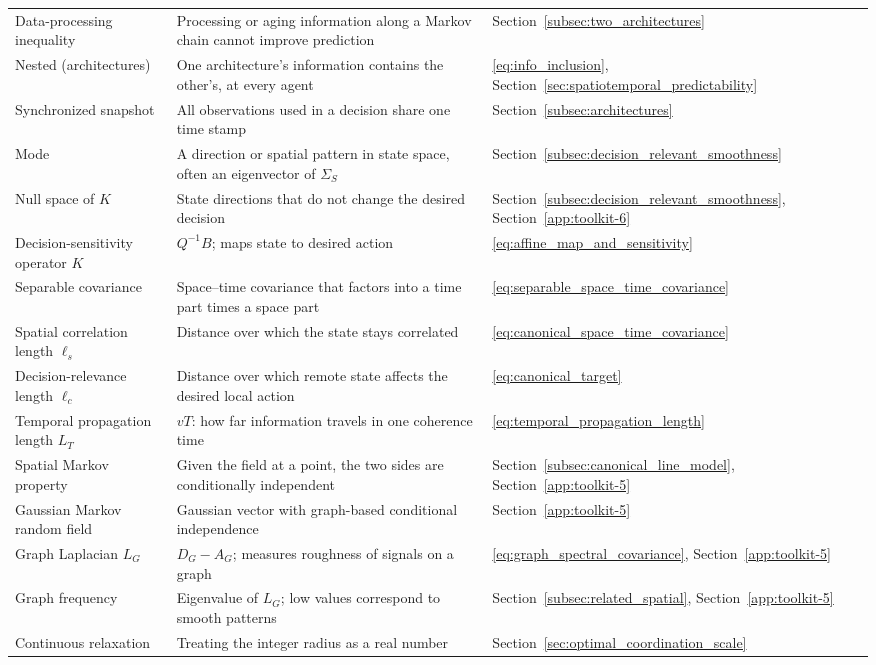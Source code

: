 \begin{longtable}{@{}p{.23\linewidth}p{.52\linewidth}p{.20\linewidth}@{}}
Data-processing inequality & Processing or aging information along a Markov chain cannot improve prediction & Section~\ref{subsec:two_architectures} \\
Nested (architectures) & One architecture's information contains the other's, at every agent & \eqref{eq:info_inclusion}, Section~\ref{sec:spatiotemporal_predictability} \\
Synchronized snapshot & All observations used in a decision share one time stamp & Section~\ref{subsec:architectures} \\
Mode & A direction or spatial pattern in state space, often an eigenvector of $\Sigma_S$ & Section~\ref{subsec:decision_relevant_smoothness} \\
Null space of $K$ & State directions that do not change the desired decision & Section~\ref{subsec:decision_relevant_smoothness}, Section~\ref{app:toolkit-6} \\
Decision-sensitivity operator $K$ & $Q^{-1}B$; maps state to desired action & \eqref{eq:affine_map_and_sensitivity} \\
Separable covariance & Space--time covariance that factors into a time part times a space part & \eqref{eq:separable_space_time_covariance} \\
Spatial correlation length $\ell_s$ & Distance over which the state stays correlated & \eqref{eq:canonical_space_time_covariance} \\
Decision-relevance length $\ell_c$ & Distance over which remote state affects the desired local action & \eqref{eq:canonical_target} \\
Temporal propagation length $L_T$ & $vT$: how far information travels in one coherence time & \eqref{eq:temporal_propagation_length} \\
Spatial Markov property & Given the field at a point, the two sides are conditionally independent & Section~\ref{subsec:canonical_line_model}, Section~\ref{app:toolkit-5} \\
Gaussian Markov random field & Gaussian vector with graph-based conditional independence & Section~\ref{app:toolkit-5} \\
Graph Laplacian $L_G$ & $D_G-A_G$; measures roughness of signals on a graph & \eqref{eq:graph_spectral_covariance}, Section~\ref{app:toolkit-5} \\
Graph frequency & Eigenvalue of $L_G$; low values correspond to smooth patterns & Section~\ref{subsec:related_spatial}, Section~\ref{app:toolkit-5} \\
Continuous relaxation & Treating the integer radius as a real number & Section~\ref{sec:optimal_coordination_scale} \\

\end{longtable}
